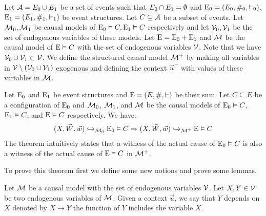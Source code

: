 \begin{definition}
    Let $\mathcal{A} = E_0 \cup E_1$ be a set of events such that
    $E_0 \cap E_1 = \emptyset$ and $\mathrm{E}_0 = (E_0,\#_0,\vdash_0)$,
    $\mathrm{E}_1 = (E_1,\#_1,\vdash_1)$ be event structures.
    Let $C \subseteq \mathcal{A}$ be a subset of events.
    Let $\mathcal{M}_0,\mathcal{M}_1$ be causal models of $\mathrm{E}_0 \vDash C,\mathrm{E}_1 \vDash C$
    respectively and let $\mathcal{V}_0,\mathcal{V}_1$ be the set of endogenous
    variables of these models.
    Let $\mathrm{E} = \mathrm{E}_0 + \mathrm{E}_1$ and $\mathcal{M}$ be the causal model of
    $\mathrm{E} \vDash C$ with the set of endogenous variables $\mathcal{V}$.
    Note that we have $\mathcal{V}_0 \cup \mathcal{V}_1 \subset \mathcal{V}$.
    We define the structured causal model $\mathcal{M}^+$ by making all variables
    in $\mathcal{V}\setminus (\mathcal{V}_0 \cup \mathcal{V}_1)$ exogenous and
    defining the context $\vec u^+$ with values of these variables in
    $\mathcal{M}$.
\end{definition}

\begin{theorem}
    Let $\mathrm{E}_0$ and $\mathrm{E}_1$ be event structures and
    $\mathrm{E} = (E,\#,\vdash)$ be their sum.
    Let $C \subseteq E$ be a configuration of $\mathrm{E}_0$
    and $\mathcal{M}_0$, $\mathcal{M}_1$, and $\mathcal{M}$ be the causal models
    of $\mathrm{E}_0 \vDash C$,$\mathrm{E}_1 \vDash C$, and $\mathrm{E} \vDash C$ respectively.
    We have:
    \begin{align*}
        (X,\vec W,\vec w) \hookrightarrow_{\mathcal{M}_0} \mathrm{E}_0 \vDash C
        \Rightarrow (X,\vec W,\vec w) \hookrightarrow_{\mathcal{M}^+} \mathrm{E} \vDash C
    \end{align*}
    The theorem intuitively states that a witness of the actual cause
    of $\mathrm{E}_0 \vDash C$ is also a witness of the actual cause of
    $\mathrm{E} \vDash C$ in $\mathcal{M}^+$.
\end{theorem}

To prove this theorem first we define some new notions and prove some lemmas.

\begin{notion}
    Let $\mathcal{M}$ be a causal model with the set of endogenous variables $\mathcal{V}$.
    Let $X,Y \in \mathcal{V}$ be two endogenous variables of $\mathcal{M}$.
    Given a context $\vec u$, we say that $Y$ depends on $X$ denoted by
    $X \to Y$ the function of $Y$ includes the variable $X$.
\end{notion}

